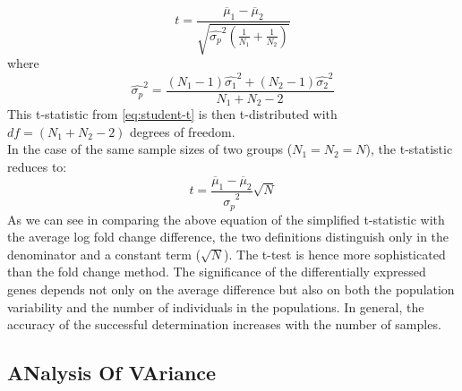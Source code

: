 \begin{equation} \label{eq:student-t}
	t = \frac	{\overline \mu_1 - \overline \mu_2}
				{ \sqrt{\hat{\sigma_p}^2 \left(\frac{1}{N_1} + \frac{1}{N_2} \right)} }
\end{equation}
where 
\begin{equation} \label{eq:pool-var}
	\hat{\sigma_p}^2 = \frac	{(N_1 - 1)\hat{\sigma_1}^2 + (N_2 - 1)\hat{\sigma_2}^2}
								{N_1 + N_2 - 2} 
\end{equation}
This t-statistic from \autoref{eq:student-t} is then t-distributed with $df = (N_1 + N_2 - 2)$ degrees of freedom.\\
In the case of the same sample sizes of two groups ($N_1 = N_2 = N$), the t-statistic reduces to:
\begin{equation} \label{eq:student-t-equal}
	t = \frac{\overline \mu_1 - \overline \mu_2}{\hat{\sigma_p}^2} \sqrt{N} 
\end{equation}
As we can see in comparing the above equation of the simplified t-statistic with the average log fold change difference, the two definitions distinguish only in the denominator and a constant term ($\sqrt{N}$). The t-test is hence more sophisticated than the fold change method. The significance of the differentially expressed genes depends not only on the average difference but also on both the population variability and the number of individuals in the populations. In general, the accuracy of the successful determination increases with the number of samples.
\subsection{{\bf AN}alysis {\bf O}f {\bf VA}riance}
	